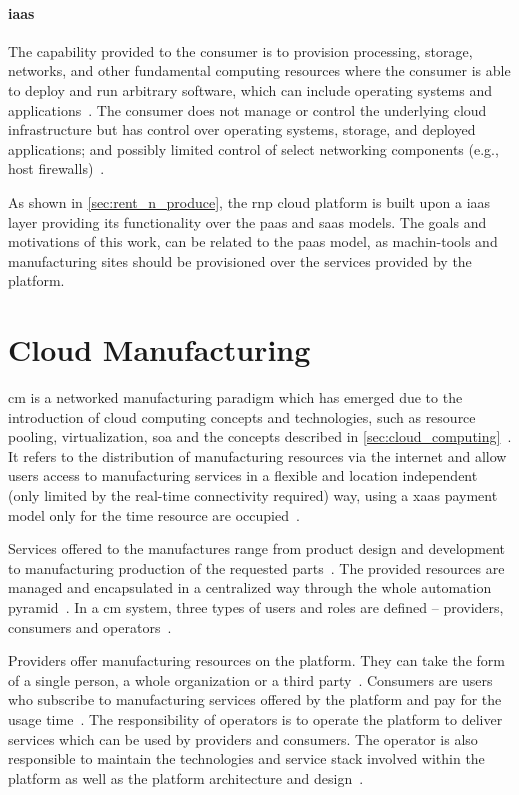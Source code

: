 \documentclass[
a4paper,
twoside,
headsepline,
cleardoublepage=empty,
parskip=half,
draft=false
]{scrbook}
\begin{document}
			\paragraph{\gls{iaas}} The capability provided to the consumer is to provision processing, storage, networks, and other fundamental computing resources where the consumer is able to deploy and run arbitrary software, which can include operating systems and applications~\cite{leymann2011cloud}. The consumer does not manage or control the underlying cloud infrastructure but has control over operating systems, storage, and deployed applications; and possibly limited control of select networking components (e.g., host firewalls)~\cite{mell2011nist}.

			As shown in \cref{sec:rent_n_produce}, the \gls{rnp} cloud platform is built upon a \gls{iaas} layer providing its functionality over the \gls{paas} and \gls{saas} models. The goals and motivations of this work, can be related to the \gls{paas} model, as machin-tools and manufacturing sites should be provisioned over the services provided by the platform.

	\newpage

		\section{Cloud Manufacturing}\label{sec:cloud_manufacturing}

			\gls{cm} is a networked manufacturing paradigm which has emerged due to the introduction of cloud computing concepts and technologies, such as resource pooling, virtualization, \gls{soa} and the concepts described in \cref{sec:cloud_computing}~\cite{macia2012cloud}.
			It refers to the distribution of manufacturing resources via the internet and allow users access to manufacturing services in a flexible and location independent (only limited by the real-time connectivity required) way, using a \gls{xaas} payment model only for the time resource are occupied~\cite{macia2012cloud}.

			Services offered to the manufactures range from product design and development to manufacturing production of the requested parts~\cite{xu2012cloud}. The provided resources  are managed and encapsulated in a centralized way through the whole automation pyramid~\cite{kleinemeier2014automatisierungspyramide}.
			In a \gls{cm} system, three types of users and roles are defined -- providers, consumers and operators~\cite{wu2013cloud}.

			Providers offer manufacturing resources on the platform.
			They can take the form of a single person, a whole organization or a third party~\cite{tao2014cciot}.
			Consumers are users who subscribe to manufacturing services offered by the platform and pay for the usage time~\cite{he2015state}.
			The responsibility of operators is to operate the platform to deliver services which can be used by providers and consumers.
			The operator is also responsible to maintain the technologies and service stack involved within the platform as well as the platform architecture and design~\cite{tedeschi2015security}.
\end{document}

